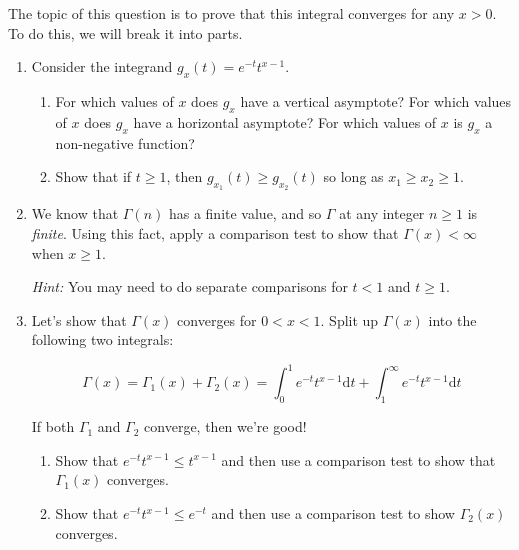 \begin{enumerate}
The topic of this question is to prove that this integral converges for any $x>0$. To do this, we will break it into parts. 

\begin{enumerate}
    \item Consider the integrand $g_x(t)=e^{-t}t^{x-1}$.
    
    \begin{enumerate}
        \item For which values of $x$ does $g_x$ have a vertical asymptote? For which values of $x$ does $g_x$ have a horizontal asymptote?
        For which values of $x$ is $g_x$ a non-negative function?
        \item Show that if $t\geq 1$, then $g_{x_1}(t) \geq g_{x_2}(t)$ so
        long as $x_1\geq x_2\geq 1$.
    \end{enumerate}

    \item We know that $\Gamma(n)$ has a finite value, and so $\Gamma$ at any integer $n\geq 1$ is
     \emph{finite}. Using this fact, apply a comparison test to show that
      $\Gamma(x)<\infty$ when $x\geq1$.

      \emph{Hint:} You may need to do separate comparisons for $t<1$ and $t\geq 1$.
    
    \item Let's show that $\Gamma(x)$ converges for $0<x<1$. Split up $\Gamma(x)$ into the following two integrals:

    \[\Gamma(x) = \Gamma_1(x) + \Gamma_2(x) = \int_0^1 e^{-t}t^{x-1}\mathrm dt + \int_1^\infty e^{-t}t^{x-1}\mathrm dt\]

    If both $\Gamma_1$ and $\Gamma_2$ converge, then we're good!

    \begin{enumerate}
        \item Show that $e^{-t}t^{x-1} \leq t^{x-1}$ and then 
        use a comparison test to show that $\Gamma_1(x)$ converges. 
        \item Show that $e^{-t}t^{x-1} \leq e^{-t}$ and then use a comparison test to show $\Gamma_2(x)$ converges.
    \end{enumerate}

    
\end{enumerate}



\end{enumerate}

